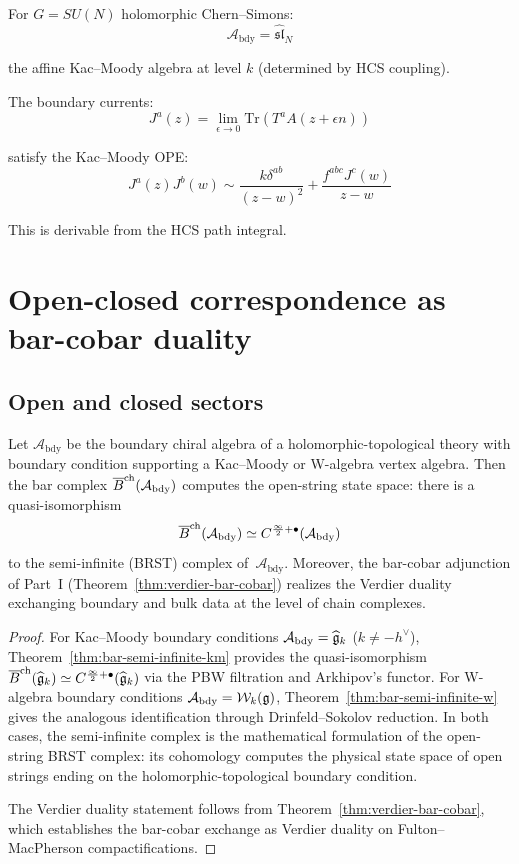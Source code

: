 \begin{example}
For $G = SU(N)$ holomorphic Chern--Simons:
\[\mathcal{A}_{\text{bdy}} = \widehat{\mathfrak{sl}}_N\]

the affine Kac--Moody algebra at level $k$ (determined by HCS coupling).

The boundary currents:
\[J^a(z) = \lim_{\epsilon \to 0} \text{Tr}(T^a A(z + \epsilon n))\]

satisfy the Kac--Moody OPE:
\[J^a(z) J^b(w) \sim \frac{k \delta^{ab}}{(z-w)^2} +
\frac{f^{abc} J^c(w)}{z-w}\]

This is derivable from the HCS path integral.
\end{example}

\section{Open-closed correspondence as bar-cobar duality}

\subsection{Open and closed sectors}

\begin{theorem}
\label{thm:open-string-bar}
Let $\mathcal{A}_{\mathrm{bdy}}$ be the boundary chiral algebra of
a holomorphic-topological theory with boundary condition supporting
a Kac--Moody or W-algebra vertex algebra.  Then the bar complex
$\overline{B}^{\mathrm{ch}}(\mathcal{A}_{\mathrm{bdy}})$ computes the
open-string state space: there is a quasi-isomorphism
\[
\overline{B}^{\mathrm{ch}}(\mathcal{A}_{\mathrm{bdy}})
\simeq
C^{\frac{\infty}{2}+\bullet}(\mathcal{A}_{\mathrm{bdy}})
\]
to the semi-infinite (BRST) complex of~$\mathcal{A}_{\mathrm{bdy}}$.
Moreover, the bar-cobar adjunction of Part~I
\textup{(}Theorem~\textup{\ref{thm:verdier-bar-cobar})} realizes
the Verdier duality exchanging boundary and bulk data at the level
of chain complexes.
\end{theorem}

\begin{proof}
For Kac--Moody boundary conditions
$\mathcal{A}_{\mathrm{bdy}} = \widehat{\mathfrak{g}}_k$ ($k \neq -h^\vee$),
Theorem~\ref{thm:bar-semi-infinite-km} provides the quasi-isomorphism
$\overline{B}^{\mathrm{ch}}(\widehat{\mathfrak{g}}_k) \simeq C^{\frac{\infty}{2}+\bullet}(\widehat{\mathfrak{g}}_k)$
via the PBW filtration and Arkhipov's functor.
For W-algebra boundary conditions
$\mathcal{A}_{\mathrm{bdy}} = \mathcal{W}_k(\mathfrak{g})$,
Theorem~\ref{thm:bar-semi-infinite-w} gives the analogous
identification through Drinfeld--Sokolov reduction.
In both cases, the semi-infinite complex is the mathematical
formulation of the open-string BRST complex: its cohomology
computes the physical state space of open strings ending on
the holomorphic-topological boundary condition.

The Verdier duality statement follows from
Theorem~\ref{thm:verdier-bar-cobar}, which establishes the
bar-cobar exchange as Verdier duality on Fulton--MacPherson
compactifications.
\end{proof}

